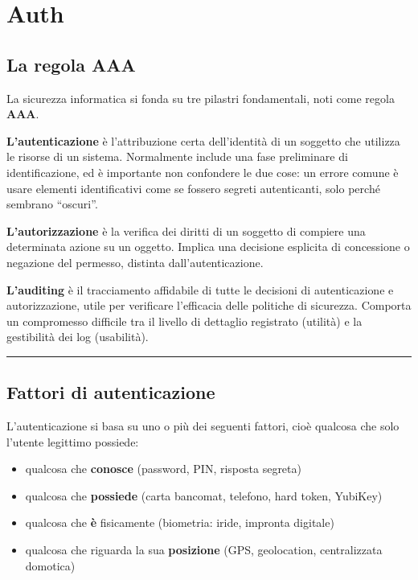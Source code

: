 \documentclass[12pt, a4paper]{report}
\begin{document}
\chapter{Auth}

\section{La regola AAA}

La sicurezza informatica si fonda su tre pilastri fondamentali, noti come regola \textbf{AAA}.

\textbf{L'autenticazione} è l'attribuzione certa dell'identità di un soggetto che utilizza le risorse di un sistema. Normalmente include una fase preliminare di identificazione, ed è importante non confondere le due cose: un errore comune è usare elementi identificativi come se fossero segreti autenticanti, solo perché sembrano ``oscuri''.

\textbf{L'autorizzazione} è la verifica dei diritti di un soggetto di compiere una determinata azione su un oggetto. Implica una decisione esplicita di concessione o negazione del permesso, distinta dall'autenticazione.

\textbf{L'auditing} è il tracciamento affidabile di tutte le decisioni di autenticazione e autorizzazione, utile per verificare l'efficacia delle politiche di sicurezza. Comporta un compromesso difficile tra il livello di dettaglio registrato (utilità) e la gestibilità dei log (usabilità).

\noindent\rule{\textwidth}{0.4pt}

\section{Fattori di autenticazione}

L'autenticazione si basa su uno o più dei seguenti fattori, cioè qualcosa che solo l'utente legittimo possiede:

\begin{itemize}
	\item qualcosa che \textbf{conosce} (password, PIN, risposta segreta)
	\item qualcosa che \textbf{possiede} (carta bancomat, telefono, hard token, YubiKey)
	\item qualcosa che \textbf{è} fisicamente (biometria: iride, impronta digitale)
	\item qualcosa che riguarda la sua \textbf{posizione} (GPS, geolocation, centralizzata domotica)
\end{itemize}
\end{document}
